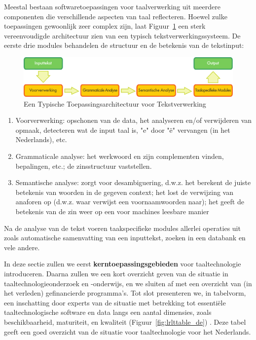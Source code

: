 \documentclass[]{../../metanetpaper}
\begin{document}
\begin{multicols}{2}
Meestal bestaan softwaretoepassingen voor taalverwerking uit meerdere componenten die verschillende aspecten van taal reflecteren. Hoewel zulke toepassingen gewoonlijk zeer complex zijn, laat Figuur~\ref{fig:textprocessingarch_de}  een sterk vereenvoudigde architectuur zien van een typisch tekstverwerkingssysteem. De eerste drie modules behandelen de structuur en de betekenis van de tekstinput:
\begin{figure}[b]
  \center
  \includegraphics[width=\textwidth]{../_media/dutch/text_processing_app_architecture}
  \caption{Een Typische Toepassingsarchitectuur voor Tekstverwerking}
  \label{fig:textprocessingarch_de}
\end{figure}
%
    \begin{enumerate}
 	\item Voorverwerking: opschonen van de data, het analyseren en/of verwijderen van opmaak, detecteren wat de input taal is, "e" door "{\"e}" vervangen (in het Nederlands), etc.
 	\item Grammaticale analyse: het werkwoord en zijn complementen vinden, bepalingen, etc.; de zinsstructuur vaststellen.
 	\item Semantische analyse: zorgt voor desambiguering, d.w.z. het berekent de juiste betekenis van woorden in de gegeven context; het lost de verwijzing van anaforen op (d.w.z. waar verwijst een voornaamwoorden naar); het geeft de betekenis van de zin weer op een voor machines leesbare manier
    \end{enumerate}
%
    Na de analyse van de tekst voeren taakspecifieke modules  allerlei operaties uit zoals automatische samenvatting van een inputtekst, zoeken in een databank en vele andere. 
    
    In deze sectie  zullen we eerst \textbf{kerntoepassingsgebieden} voor taaltechnologie introduceren. Daarna zullen we een kort overzicht geven van de situatie in taaltechnologieonderzoek en -onderwijs, en we sluiten af met een overzicht van (in het verleden) gefinancierde programma's. Tot slot presenteren we, in tabelvorm, een inschatting door experts van de situatie met betrekking tot essenti{\"e}le taaltechnologische software en data langs een aantal dimensies, zoals beschikbaarheid, maturiteit, en kwaliteit (Figuur~\ref{fig:lrlttable_de}) . Deze tabel geeft een goed overzicht van de situatie voor taaltechnologie voor het Nederlands.


\end{multicols}
\end{document}
